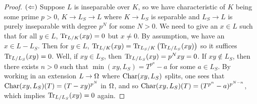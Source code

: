 \documentclass[./main.tex]{subfiles}
\begin{document}
\begin{proof}
  $(\Leftarrow)$
  Suppose $L$ is inseparable over $K$,
  so we have characteristic of $K$ being some prime $p > 0$,
  $K \to L_S \to L$ where $K \to L_S$ is separable and 
  $L_S \to L$ is purely inseparable with degree $p^N$ for some $N > 0$.
  We need to give an $x \in L$ such that 
  for all $y \in L$, $\operatorname{Tr}_{L/K}(xy) = 0$ but $x \neq 0$.
  By assumption, we have an $x \in L \minus L_S$.
  Then for $y \in L$, $\operatorname{Tr}_{L/K}(xy) = \operatorname{Tr}_{L_S/K}\left(\operatorname{Tr}_{L/L_S}(xy)\right)$
  so it suffices $\operatorname{Tr}_{L/L_S}(xy) = 0$.
  Well, if $xy \in L_S$, 
  then $\operatorname{Tr}_{L/L_S}(xy) = p^N xy = 0$.
  If $xy \notin L_S$, 
  then there exists $n > 0$ such that $\min(xy,L_S) = T^{p^n} - a$
  for some $a \in L_S$.
  By working in an extension $L \to \Omega$ where $\operatorname{Char}(xy,L_S)$ splits,
  one sees that $\operatorname{Char}(xy,L_S)(T) = (T - xy)^{p^N}$ in $\Omega$,
  and so $\operatorname{Char}(xy,L_S)(T) = (T^{p^n} - a)^{p^{N-n}}$,
  which implies $\operatorname{Tr}_{L/L_S}(xy) = 0$ again. 
  
\end{proof}
\end{document}
